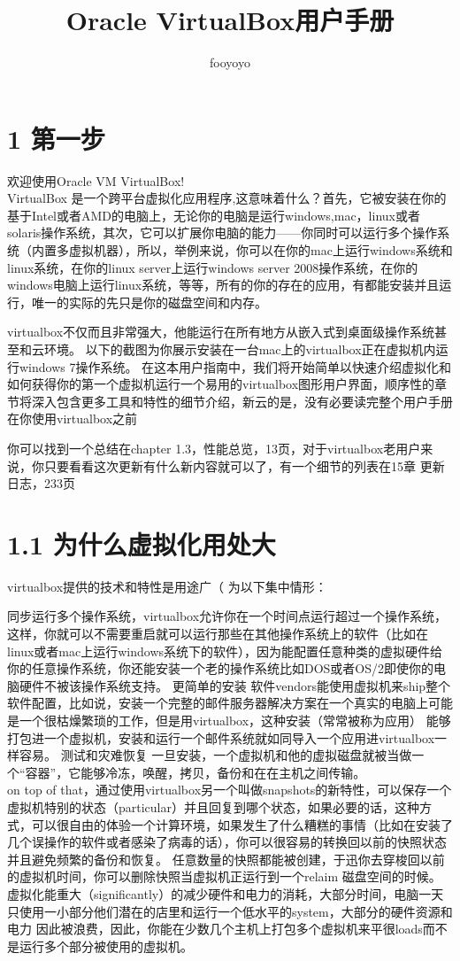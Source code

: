 \documentclass[•]{article}
\title{Oracle VirtualBox用户手册}
\date{}
\author{fooyoyo}
\begin{document}
\maketitle
\section{1 第一步}
欢迎使用Oracle VM VirtualBox!\\

VirtualBox 是一个跨平台虚拟化应用程序,这意味着什么？首先，它被安装在你的基于Intel或者AMD的电脑上，无论你的电脑是运行windows,mac，linux或者solaris操作系统，其次，它可以扩展你电脑的能力——你同时可以运行多个操作系统（内置多虚拟机器），所以，举例来说，你可以在你的mac上运行windows系统和linux系统，在你的linux server上运行windows server 2008操作系统，在你的windows电脑上运行linux系统，等等，所有的你的存在的应用，有都能安装并且运行，唯一的实际的先只是你的磁盘空间和内存。

virtualbox不仅而且非常强大，他能运行在所有地方从嵌入式到桌面级操作系统甚至和云环境。
以下的截图为你展示安装在一台mac上的virtualbox正在虚拟机内运行windows 7操作系统。
在这本用户指南中，我们将开始简单以快速介绍虚拟化和如何获得你的第一个虚拟机运行一个易用的virtualbox图形用户界面，顺序性的章节将深入包含更多工具和特性的细节介绍，新云的是，没有必要读完整个用户手册在你使用virtualbox之前

你可以找到一个总结在chapter 1.3，性能总览，13页，对于virtualbox老用户来说，你只要看看这次更新有什么新内容就可以了，有一个细节的列表在15章 更新日志，233页

\section{1.1 为什么虚拟化用处大}
virtualbox提供的技术和特性是用途广（%
为以下集中情形：

同步运行多个操作系统，virtualbox允许你在一个时间点运行超过一个操作系统，这样，你就可以不需要重启就可以运行那些在其他操作系统上的软件（比如在linux或者mac上运行windows系统下的软件），因为能配置任意种类的虚拟硬件给你的任意操作系统，你还能安装一个老的操作系统比如DOS或者OS/2即使你的电脑硬件不被该操作系统支持。
更简单的安装 软件vendors能使用虚拟机来ship整个软件配置，比如说，安装一个完整的邮件服务器解决方案在一个真实的电脑上可能是一个很枯燥繁琐的工作，但是用virtualbox，这种安装（常常被称为应用） 能够打包进一个虚拟机，安装和运行一个邮件系统就如同导入一个应用进virtualbox一样容易。
测试和灾难恢复 一旦安装，一个虚拟机和他的虚拟磁盘就被当做一个“容器”，它能够冷冻，唤醒，拷贝，备份和在在主机之间传输。\\
on top of that，通过使用virtualbox另一个叫做snapshots的新特性，可以保存一个虚拟机特别的状态（particular）并且回复到哪个状态，如果必要的话，这种方式，可以很自由的体验一个计算环境，如果发生了什么糟糕的事情（比如在安装了几个误操作的软件或者感染了病毒的话），你可以很容易的转换回以前的快照状态并且避免频繁的备份和恢复。
任意数量的快照都能被创建，于迅你去穿梭回以前的虚拟机时间，你可以删除快照当虚拟机正运行到一个relaim 磁盘空间的时候。
虚拟化能重大（significantly）的减少硬件和电力的消耗，大部分时间，电脑一天只使用一小部分他们潜在的店里和运行一个低水平的system，大部分的硬件资源和电力 因此被浪费，因此，你能在少数几个主机上打包多个虚拟机来平很loads而不是运行多个部分被使用的虚拟机。
\end{document}
